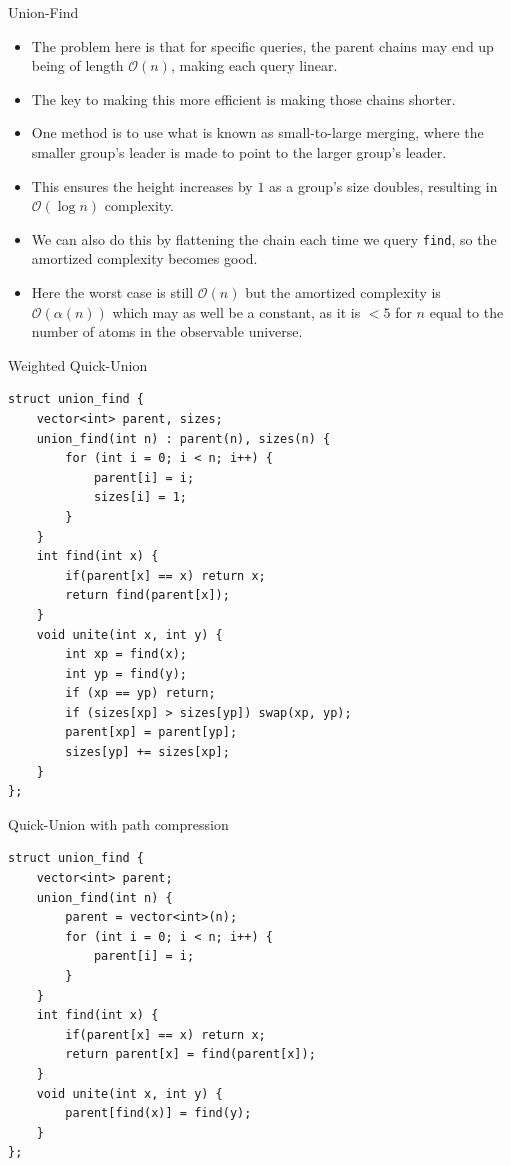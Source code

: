 \documentclass{beamer}
\begin{document}
\begin{frame}[plain]{Union-Find}
    \begin{itemize}
        \item<1-> The problem here is that for specific queries, the parent chains may end up being of length $\mathcal{O}(n)$, making each query linear.
        \item<1-> The key to making this more efficient is making those chains shorter.
        \item<2-> One method is to use what is known as small-to-large merging, where the smaller group's leader is made to point to the larger group's leader.
        \item<2-> This ensures the height increases by $1$ as a group's size doubles, resulting in $\mathcal{O}(\log n)$ complexity.
        \item<3-> We can also do this by flattening the chain each time we query \texttt{find}, so the amortized complexity becomes good.
        \item<3-> Here the worst case is still $\mathcal{O}(n)$ but the amortized complexity is $\mathcal{O}(\alpha(n))$ which may as well be a constant, as it is $<5$ for $n$ equal to the number of atoms in the observable universe.
    \end{itemize}
\end{frame}

\begin{frame}{Weighted Quick-Union}
    \begin{tiny}
    \begin{verbatim}
struct union_find {
    vector<int> parent, sizes;
    union_find(int n) : parent(n), sizes(n) {
        for (int i = 0; i < n; i++) {
            parent[i] = i;
            sizes[i] = 1;
        }
    }
    int find(int x) {
        if(parent[x] == x) return x;
        return find(parent[x]);
    }
    void unite(int x, int y) {
        int xp = find(x);
        int yp = find(y);
        if (xp == yp) return;
        if (sizes[xp] > sizes[yp]) swap(xp, yp);
        parent[xp] = parent[yp];
        sizes[yp] += sizes[xp];
    }
};
    \end{verbatim}
    \end{tiny}
\end{frame}

\begin{frame}{Quick-Union with path compression}
    \begin{small}
    \begin{verbatim}
struct union_find {
    vector<int> parent;
    union_find(int n) {
        parent = vector<int>(n);
        for (int i = 0; i < n; i++) {
            parent[i] = i;
        }
    }
    int find(int x) {
        if(parent[x] == x) return x;
        return parent[x] = find(parent[x]);
    }
    void unite(int x, int y) {
        parent[find(x)] = find(y);
    }
};
    \end{verbatim}
    \end{small}
\end{frame}
\end{document}
